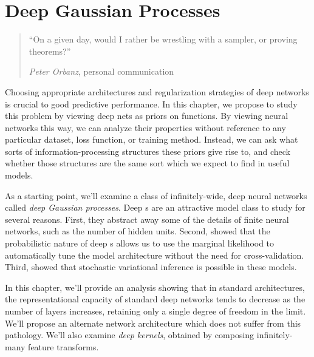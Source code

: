
\inbpdocument


\chapter{Deep Gaussian Processes}
\label{ch:deep-limits}

\begin{quotation}
``On a given day, would I rather be wrestling with a sampler, or proving theorems?''

\hspace*{\fill} \emph{Peter Orbanz}, personal communication
\end{quotation}




Choosing appropriate architectures and regularization strategies of deep networks is crucial to good predictive performance.
In this chapter, we propose to study this problem by viewing deep nets as priors on functions.
By viewing neural networks this way, we can analyze their properties without reference to any particular dataset, loss function, or training method.
Instead, we can ask what sorts of information-processing structures these priors give rise to, and check whether those structures are the same sort which we expect to find in useful models.

As a starting point, we'll examine a class of infinitely-wide, deep neural networks called \emph{deep Gaussian processes}.
Deep \gp{}s are an attractive model class to study for several reasons.
First, they abstract away some of the details of finite neural networks, such as the number of hidden units.
Second, \citet{damianou2012deep} showed that the probabilistic nature of deep \gp{}s allows us to use the marginal likelihood to automatically tune the model architecture without the need for cross-validation.
Third, \citet{hensman2014deep} showed that stochastic variational inference is possible in these models.

In this chapter, we'll provide an analysis showing that in standard architectures, the representational capacity of standard deep networks tends to decrease as the number of layers increases, retaining only a single degree of freedom in the limit.
We'll propose an alternate network architecture which does not suffer from this pathology.
We'll also examine \emph{deep kernels}, obtained by composing infinitely-many feature transforms.

